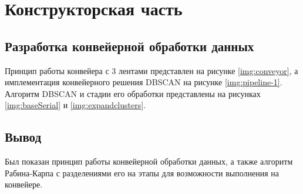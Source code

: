 \chapter{Конструкторская часть}

\section{Разработка конвейерной обработки данных}

Принцип работы конвейера с 3 лентами представлен на рисунке \ref{img:conveyor}, а имплементация конвейерного решения DBSCAN на рисунке \ref{img:pipeline-1}. Алгоритм DBSCAN и стадии его обработки представлены на рисунках \ref{img:baseSerial} и \ref{img:expandclusters}.

\clearpage
{}
\clearpage
{}
\clearpage
{}
\clearpage


\section*{Вывод}

Был показан принцип работы конвейерной обработки данных, а также алгоритм Рабина-Карпа с разделениями его на этапы для возможности выполнения на конвейере.
